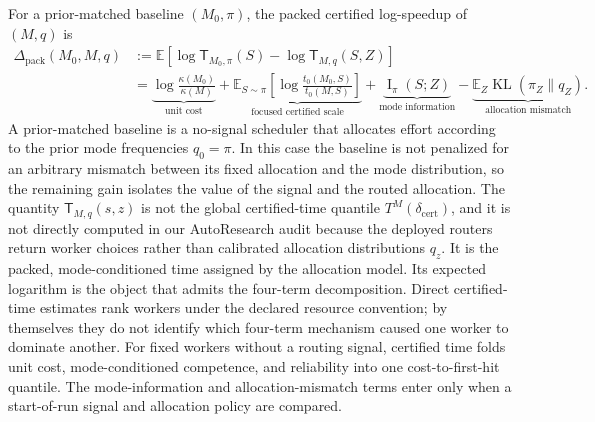 \documentclass{article}
\newcommand{\newtext}[1]{\textcolor{green!50!black}{#1}}
\DeclareMathOperator{\KL}{KL}
\DeclareMathOperator{\MI}{I}
\newcommand{\E}{\mathbb{E}}
\begin{document}
For a prior-matched baseline \((M_0,\pi)\), the packed certified log-speedup of
\((M,q)\) is
\begin{equation}
\label{eq:four-term-prior}
\begin{aligned}
    \Delta_{\mathrm{pack}}(M_0,M,q)
    &:=
    \E\!\left[
        \log \mathsf T_{M_0,\pi}(S)
        -
        \log \mathsf T_{M,q}(S,Z)
    \right]
    \\
    &=
    \underbrace{\log\frac{\kappa(M_0)}{\kappa(M)}}_{\text{unit cost}}
    +
    \underbrace{
    \E_{S\sim\pi}
    \left[
        \log\frac{t_0(M_0,S)}{t_0(M,S)}
    \right]
    }_{\text{focused certified scale}}
    +
    \underbrace{\MI_\pi(S;Z)}_{\text{mode information}}
    -
    \underbrace{\E_Z\KL(\pi_Z\|q_Z)}_{\text{allocation mismatch}} .
\end{aligned}
\end{equation}
\newtext{A prior-matched baseline is a no-signal scheduler that allocates effort according to the prior mode frequencies \(q_0=\pi\). In this case the baseline is not penalized for an arbitrary mismatch between its fixed allocation and the mode distribution, so the remaining gain isolates the value of the signal and the routed allocation. The quantity \(\mathsf T_{M,q}(s,z)\) is not the global certified-time quantile \(T^M(\delta_{\mathrm{cert}})\), and it is not directly computed in our AutoResearch audit because the deployed routers return worker choices rather than calibrated allocation distributions \(q_z\). It is the packed, mode-conditioned time assigned by the allocation model. Its expected logarithm is the object that admits the four-term decomposition. Direct certified-time estimates rank workers under the declared resource convention; by themselves they do not identify which four-term mechanism caused one worker to dominate another. For fixed workers without a routing signal, certified time folds unit cost, mode-conditioned competence, and reliability into one cost-to-first-hit quantile. The mode-information and allocation-mismatch terms enter only when a start-of-run signal and allocation policy are compared.}
\end{document}
